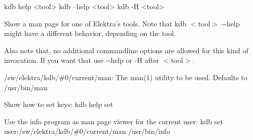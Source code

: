 
\begin{DoxyCode}
kdb help <tool>
kdb --help <tool>
kdb -H <tool>
\end{DoxyCode}


Show a man page for one of Elektra’s tools. Note that {\ttfamily kdb $<$tool$>$ -\/-\/help} might have a different behavior, depending on the tool.

Also note that, no additional commandline options are allowed for this kind of invocation. If you want that use {\ttfamily -\/-\/help} or {\ttfamily -\/H} after {\ttfamily $<$tool$>$}.


\begin{DoxyItemize}
\item {\ttfamily /sw/elektra/kdb/\#0/current/man}\+: The man(1) utility to be used. Defaults to /usr/bin/man
\end{DoxyItemize}

Show how to set keys\+: {\ttfamily kdb help set}

Use the info program as man page viewer for the current user\+: {\ttfamily kdb set user\+:/sw/elektra/kdb/\#0/current/man /usr/bin/info} 